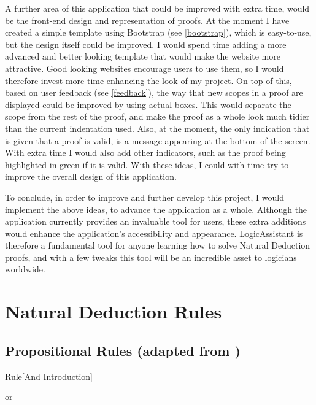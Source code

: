 A further area of this application that could be improved with extra time, would be the front-end design and representation of proofs. At the moment I have created a simple template using Bootstrap (see \ref{bootstrap}), which is easy-to-use, but the design itself could be improved. I would spend time adding a more advanced and better looking template that would make the website more attractive. Good looking websites encourage users to use them, so I would therefore invest more time enhancing the look of my project. On top of this, based on user feedback (see \ref{feedback}), the way that new scopes in a proof are displayed could be improved by using actual boxes. This would separate the scope from the rest of the proof, and make the proof as a whole look much tidier than the current indentation used. Also, at the moment, the only indication that is given that a proof is valid, is a message appearing at the bottom of the screen. With extra time I would also add other indicators, such as the proof being highlighted in green if it is valid. With these ideas, I could with time try to improve the overall design of this application.

To conclude, in order to improve and further develop this project, I would implement the above ideas, to advance the application as a whole. Although the application currently provides an invaluable tool for users, these extra additions would enhance the application's accessibility and appearance. LogicAssistant is therefore a fundamental tool for anyone learning how to solve Natural Deduction proofs, and with a few tweaks this tool will be an incredible asset to logicians worldwide.

\pagebreak
\appendix
\section{Natural Deduction Rules}
\label{appendix:nd}

\subsection{Propositional Rules (adapted from \cite{ndBook})}
\label{appendix:nd-prop}


\begin{namedthm}{Rule}[And Introduction]

\begin{bprooftree}
\end{bprooftree}\qquad or \qquad
\begin{bprooftree}
\end{bprooftree}

\end{namedthm}

